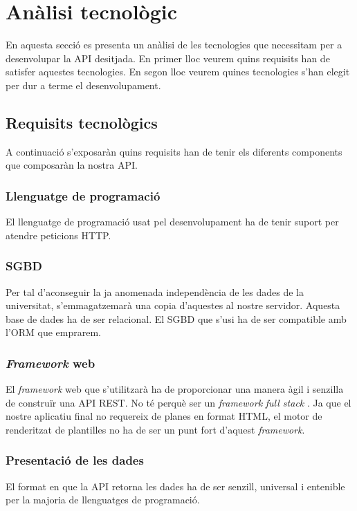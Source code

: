 \section{Anàlisi tecnològic}
En aquesta secció es presenta un anàlisi de les tecnologies que necessitam per a desenvolupar la \ac{API} desitjada. En primer lloc veurem quins requisits han de satisfer aquestes tecnologies. En segon lloc veurem quines tecnologies s'han elegit per dur a terme el desenvolupament.

\subsection{Requisits tecnològics}
A continuació s'exposaràn quins requisits han de tenir els diferents components que composaràn la nostra \ac{API}. 
	
	\subsubsection{Llenguatge de programació}
	El llenguatge de programació usat pel desenvolupament ha de tenir suport per atendre peticions \ac{HTTP}. 
	
	\subsubsection{\ac{SGBD}}
	Per tal d'aconseguir la ja anomenada independència de les dades de la universitat, s'emmagatzemarà una copia d'aquestes al nostre servidor. Aquesta base de dades ha de ser relacional. El \ac{SGBD} que s'usi ha de ser compatible amb l'\ac{ORM} que emprarem.

	
	\subsubsection{\emph{Framework} web}
	El \emph{framework} web que s'utilitzarà ha de proporcionar una manera àgil i senzilla de construïr una \ac{API} \ac{REST}. No té perquè ser un \emph{framework} \emph{full stack} \cite{web_framework}. Ja que el nostre aplicatiu final no requereix de planes en format \ac{HTML}, el motor de renderitzat de plantilles no ha de ser un punt fort d'aquest \emph{framework}.
	
	\subsubsection{Presentació de les dades}
	El format en que la \ac{API} retorna les dades ha de ser senzill, universal i entenible per la majoria de llenguatges de programació.

